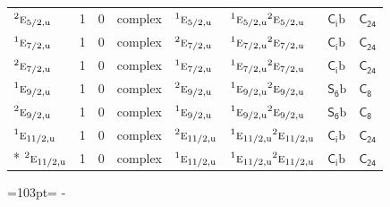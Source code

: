 \documentclass[10pt,a4paper]{article}
\newcommand{\needspace}[1]{\par\penalty-100\begingroup\dimen0=#1\relax\dimen2=\pagegoal
  \advance\dimen2-\pagetotal\ifdim\dimen0>\dimen2\relax\ifdim\dimen2>0pt\vfil\break\fi\fi
  \endgroup}
\numberwithin{equation}{section}
\newcommand{\grp}[1]{\mathsf{#1}}
\newcommand{\irr}[1]{\text{\normalfont\scshape #1}}
\newcommand{\conjpair}[1]{{}^{#1}}
\newcommand{\ptag}[1]{\mathrm{#1}}
\newcommand{\secondclass}{\mathrm{b}}
\begin{document}
{\begin{longtable}{@{}lrrlllll@{}}
$\conjpair{2}\irr{e}_{5/2,\ptag{u}}$ & 1 & $0$ & complex & $\conjpair{1}\irr{e}_{5/2,\ptag{u}}$ & $\conjpair{1}\irr{e}_{5/2,\ptag{u}}\conjpair{2}\irr{e}_{5/2,\ptag{u}}$ & \href{S2b.pdf}{$\grp{C_{i}}\secondclass$} & $\grp{C_{24}}$\\
$\conjpair{1}\irr{e}_{7/2,\ptag{u}}$ & 1 & $0$ & complex & $\conjpair{2}\irr{e}_{7/2,\ptag{u}}$ & $\conjpair{1}\irr{e}_{7/2,\ptag{u}}\conjpair{2}\irr{e}_{7/2,\ptag{u}}$ & \href{S2b.pdf}{$\grp{C_{i}}\secondclass$} & $\grp{C_{24}}$\\
$\conjpair{2}\irr{e}_{7/2,\ptag{u}}$ & 1 & $0$ & complex & $\conjpair{1}\irr{e}_{7/2,\ptag{u}}$ & $\conjpair{1}\irr{e}_{7/2,\ptag{u}}\conjpair{2}\irr{e}_{7/2,\ptag{u}}$ & \href{S2b.pdf}{$\grp{C_{i}}\secondclass$} & $\grp{C_{24}}$\\
$\conjpair{1}\irr{e}_{9/2,\ptag{u}}$ & 1 & $0$ & complex & $\conjpair{2}\irr{e}_{9/2,\ptag{u}}$ & $\conjpair{1}\irr{e}_{9/2,\ptag{u}}\conjpair{2}\irr{e}_{9/2,\ptag{u}}$ & \href{S6b.pdf}{$\grp{S_{6}}\secondclass$} & \href{../../../rotation/data/pdf/C8.pdf}{$\grp{C_{8}}$}\\
$\conjpair{2}\irr{e}_{9/2,\ptag{u}}$ & 1 & $0$ & complex & $\conjpair{1}\irr{e}_{9/2,\ptag{u}}$ & $\conjpair{1}\irr{e}_{9/2,\ptag{u}}\conjpair{2}\irr{e}_{9/2,\ptag{u}}$ & \href{S6b.pdf}{$\grp{S_{6}}\secondclass$} & \href{../../../rotation/data/pdf/C8.pdf}{$\grp{C_{8}}$}\\
$\conjpair{1}\irr{e}_{11/2,\ptag{u}}$ & 1 & $0$ & complex & $\conjpair{2}\irr{e}_{11/2,\ptag{u}}$ & $\conjpair{1}\irr{e}_{11/2,\ptag{u}}\conjpair{2}\irr{e}_{11/2,\ptag{u}}$ & \href{S2b.pdf}{$\grp{C_{i}}\secondclass$} & $\grp{C_{24}}$\\*
$\conjpair{2}\irr{e}_{11/2,\ptag{u}}$ & 1 & $0$ & complex & $\conjpair{1}\irr{e}_{11/2,\ptag{u}}$ & $\conjpair{1}\irr{e}_{11/2,\ptag{u}}\conjpair{2}\irr{e}_{11/2,\ptag{u}}$ & \href{S2b.pdf}{$\grp{C_{i}}\secondclass$} & $\grp{C_{24}}$\\
\bottomrule\end{longtable}}
\needspace{103pt}
\end{document}
